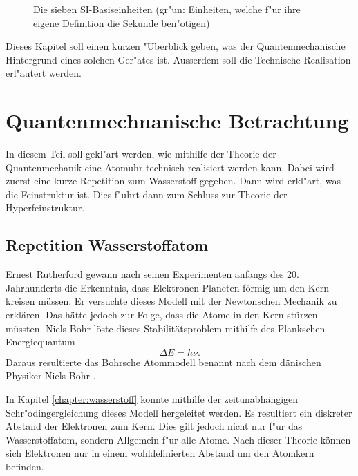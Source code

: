 \begin{refsection}
\begin{figure}
  \caption{Die sieben SI-Basiseinheiten \cite{wiki:si} (gr"un: Einheiten, welche f"ur
    ihre eigene Definition die Sekunde ben"otigen)}
  \label{fig:siBasis}
\end{figure}

Dieses Kapitel soll einen kurzen "Uberblick geben, was der Quantenmechanische Hintergrund eines solchen Ger"ates ist. Ausserdem soll die Technische Realisation erl"autert werden.


\section{Quantenmechnanische Betrachtung}

In diesem Teil soll gekl"art werden, wie mithilfe der Theorie der Quantenmechanik eine Atomuhr technisch realisiert werden kann. Dabei wird zuerst eine kurze Repetition zum Wasserstoff gegeben. Dann wird erkl"art, was die Feinstruktur ist. Dies f"uhrt dann zum Schluss zur Theorie der Hyperfeinstruktur.

\subsection{Repetition Wasserstoffatom}
Ernest Rutherford gewann nach seinen Experimenten anfangs des 20. Jahrhunderts die Erkenntnis, dass Elektronen Planeten förmig um den Kern kreisen müssen. 
Er versuchte dieses Modell mit der Newtonschen Mechanik zu erklären. 
Das hätte jedoch zur Folge, dass die Atome in den Kern stürzen müssten. 
Niels Bohr löste dieses Stabilitätsproblem mithilfe des Plankschen Energiequantum 
\begin{equation}
\varDelta E = h\nu.
\end{equation}
Daraus resultierte das Bohrsche Atommodell benannt nach dem dänischen Physiker Niels Bohr \cite{wiki:bohr}. 

In Kapitel \ref{chapter:wasserstoff} konnte mithilfe der zeitunabhängigen Schr"odingergleichung dieses Modell hergeleitet werden.
Es resultiert ein diskreter Abstand der Elektronen zum Kern.
Dies gilt jedoch nicht nur f"ur das Wasserstoffatom, sondern Allgemein f"ur alle Atome.
Nach dieser Theorie können sich Elektronen nur in einem wohldefinierten Abstand um den Atomkern befinden. 


\end{refsection}
